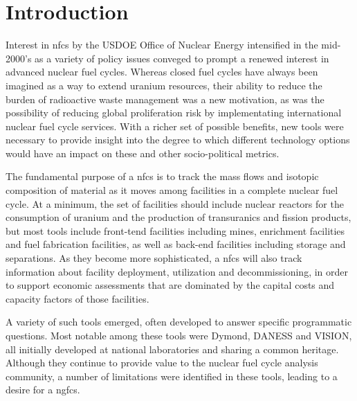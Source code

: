 \chapter{Introduction}

Interest in \gls{nfcs} by the \gls{USDOE} Office of Nuclear Energy intensified
in the mid-2000's as a variety of policy issues conveged to prompt a renewed
interest in advanced nuclear fuel cycles.  Whereas closed fuel cycles have
always been imagined as a way to extend uranium resources, their ability to
reduce the burden of radioactive waste management was a new motivation, as was
the possibility of reducing global proliferation risk by implementating
international nuclear fuel cycle services.  With a richer set of possible
benefits, new tools were necessary to provide insight into the degree to which
different technology options would have an impact on these and other
socio-political metrics.

The fundamental purpose of a \gls{nfcs} is to track the mass flows and
isotopic composition of material as it moves among facilities in a complete
nuclear fuel cycle.  At a minimum, the set of facilities should include
nuclear reactors for the consumption of uranium and the production of
transuranics and fission products, but most tools include front-tend
facilities including mines, enrichment facilities and fuel fabrication
facilities, as well as back-end facilities including storage and separations.
As they become more sophisticated, a \gls{nfcs} will also track information
about facility deployment, utilization and decommissioning, in order to
support economic assessments that are dominated by the capital costs and
capacity factors of those facilities.

A variety of such tools emerged, often developed to answer specific
programmatic questions.  Most notable among these tools were Dymond, DANESS
and VISION, all initially developed at national laboratories and sharing a
common heritage.  Although they continue to provide value to the nuclear fuel
cycle analysis community, a number of limitations were identified in these
tools, leading to a desire for a \gls{ngfcs}.

